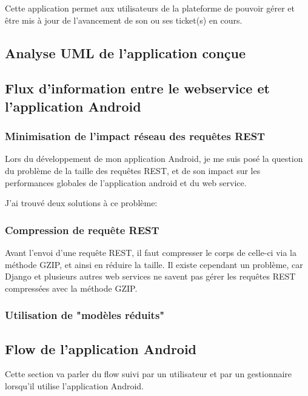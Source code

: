 \documentclass[12pt,table,a4paper]{report}
\begin{document}
Cette application permet aux utilisateurs de la plateforme de pouvoir gérer et être mis à jour de l'avancement de son ou ses ticket(s) en cours.

\subsection{Analyse UML de l'application conçue}

\subsection{Flux d'information entre le webservice et l'application Android}

\subsubsection{Minimisation de l'impact réseau des requêtes REST}
Lors du développement de mon application Android, je me suis posé la question du problème de la taille des requêtes REST, et de son impact sur les performances globales de l'application android et du web service.

J'ai trouvé deux solutions à ce problème:

\subsubsection{Compression de requête REST}
Avant l'envoi d'une requête REST, il faut compresser le corps de celle-ci via la méthode GZIP, et ainsi en réduire la taille. Il existe cependant un problème, car Django et plusieurs autres web services ne savent pas gérer les requêtes REST compressées avec la méthode GZIP.

\subsubsection{Utilisation de "modèles réduits"}
\todo{}

\subsection{Flow de l'application Android}
Cette section va parler du flow suivi par un utilisateur et par un gestionnaire lorsqu'il utilise l'application Android.
\end{document}
